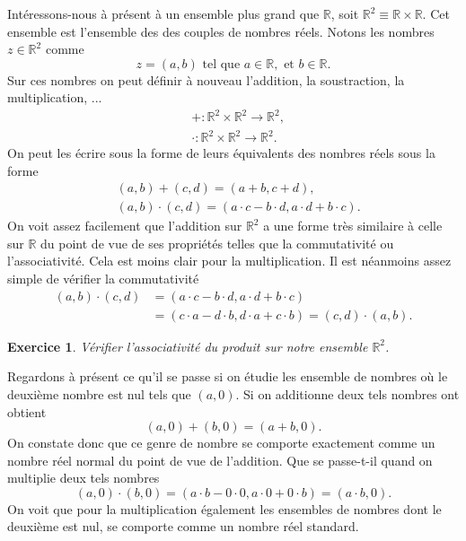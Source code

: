 \documentclass[a4paper,12pt]{book}
\newcommand{\real}{\mathbb{R}}
\newtheorem*{exercice}{Exercice}
\begin{document}
Intéressons-nous à présent à un ensemble plus grand que $\real$, soit $\real^2\equiv\real\times\real$. Cet ensemble est l'ensemble des
des couples de nombres réels. Notons les nombres $z\in\real^2$ comme 
\begin{equation}
 z=(a,b)\mbox{ tel que } a\in\real, \mbox{ et } b\in\real.
\end{equation}
Sur ces nombres on peut définir à nouveau l'addition, la soustraction, la multiplication, ...
\begin{align}
& +:\real^2\times\real^2\rightarrow\real^2,\\
& \cdot:\real^2\times\real^2\rightarrow\real^2.
\end{align}
On peut les écrire sous la forme de leurs équivalents des nombres réels sous la forme
\begin{align}
&(a,b)+(c,d)=(a+b,c+d),\label{eq_add}\\
&(a,b)\cdot(c,d)=(a\cdot c-b\cdot d,a\cdot d+b\cdot c).\label{eq_mult}
\end{align}
On voit assez facilement que l'addition sur $\real^2$ a une forme très similaire 
à celle sur $\real$ du point de vue de ses propriétés telles que la commutativité ou l'associativité.
Cela est moins clair pour la multiplication. Il est néanmoins assez simple de vérifier la commutativité
\begin{align}
(a,b)\cdot(c,d)&=(a\cdot c-b\cdot d,a\cdot d+b\cdot c)\nonumber\\
&=(c\cdot a-d\cdot b,d\cdot a+c\cdot b)=(c,d)\cdot (a,b).
\end{align}
\begin{exercice}
 Vérifier l'associativité du produit sur notre ensemble $\real^2$.
\end{exercice}
Regardons à présent ce qu'il se passe si on étudie les ensemble de nombres où le deuxième nombre est nul
tels que $(a,0)$. Si on additionne deux tels nombres ont obtient
\begin{equation}
 (a,0)+(b,0)=(a+b,0).
\end{equation}On constate donc que ce genre de nombre se comporte exactement comme un nombre réel normal du point de vue de l'addition.
Que se passe-t-il quand on multiplie deux tels nombres
\begin{equation}
 (a,0)\cdot(b,0)=(a\cdot b-0\cdot 0,a\cdot 0+0\cdot b)=(a\cdot b,0).
\end{equation}
On voit que pour la multiplication également les ensembles de nombres dont le deuxième est nul, se comporte comme un nombre réel standard.
\end{document}
